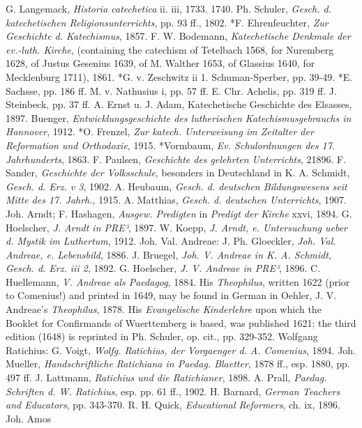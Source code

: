 G. Langemack, \emph{Historia catechetica} ii. iii, 1733. 1740. Ph. Schuler, \emph{Gesch. d. katechetischen Religionsunterrichts}, pp. 93 ff., 1802. *F. Ehrenfeuchter, \emph{Zur Geschichte d. Katechismus}, 1857. F. W. Bodemann, \emph{Katechetische Denkmale der ev.-luth. Kirche}, (containing the catechism of Tetelbach 1568, for Nuremberg 1628, of Justus Gesenius 1639, of M. Walther 1653, of Glassius 1640, for Mecklenburg 1711), 1861. *G. v. Zeschwitz ii 1. Schuman-Sperber, pp. 39-49. *E. Sachsse, pp. 186 ff. M. v. Nathusius i, pp. 57 ff. E. Chr. Achelis, pp. 319 ff. J. Steinbeck, pp. 37 ff. A. Ernst u. J. Adam, Katechetische Geschichte des Elsasses, 1897. Buenger, \emph{Entwicklungsgeschichte des lutherischen Katechismusgebrauchs in Hannover}, 1912. *O. Frenzel, \emph{Zur katech. Unterweisung im Zeitalter der Reformation und Orthodoxie}, 1915. *Vormbaum, \emph{Ev. Schulordnungen des 17. Jahrhunderts}, 1863. F. Paulsen, \emph{Geschichte des gelehrten Unterrichts}, 21896. F. Sander, \emph{Geschichte der Volksschule}, besonders in Deutschland in K. A. Schmidt, \emph{Gesch. d. Erz. v 3}, 1902. A. Heubaum, \emph{Gesch. d. deutschen Bildungswesens seit Mitte des 17. Jahrh.}, 1915. A. Matthias, \emph{Gesch. d. deutschen Unterrichts}, 1907. Joh. Arndt; F. Hashagen, \emph{Ausgew. Predigten} in \emph{Predigt der Kirche} xxvi, 1894. G. Hoelscher, \emph{J. Arndt in PRE³}, 1897. W. Koepp, \emph{J. Arndt, e. Untersuchung ueber d. Mystik im Luthertum}, 1912. Joh. Val. Andreae: J. Ph. Gloeckler, \emph{Joh. Val. Andreae, e. Lebensbild}, 1886. J. Bruegel, \emph{Joh. V. Andreae in K. A. Schmidt, Gesch. d. Erz. iii 2}, 1892. G. Hoelscher, \emph{J. V. Andreae in PRE³}, 1896. C. Huellemann, \emph{V. Andreae als Paedagog}, 1884. His \emph{Theophilus}, written 1622 (prior to Comenius!) and printed in 1649, may be found in German in Oehler, J. V. Andreae's \emph{Theophilus}, 1878. His \emph{Evangelische Kinderlehre} upon which the Booklet for Confirmands of Wuerttemberg is based, was published 1621; the third edition (1648) is reprinted in Ph. Schuler, op. cit., pp. 329-352. Wolfgang Ratichius: G. Voigt, \emph{Wolfg. Ratichius, der Vorgaenger d. A. Comenius}, 1894. Joh. Mueller, \emph{Handschriftliche Ratichiana in Paedag. Blaetter}, 1878 ff., esp. 1880, pp. 497 ff. J. Lattmann, \emph{Ratichius und die Ratichianer}, 1898. A. Prall, \emph{Paedag. Schriften d. W. Ratichius}, esp. pp. 61 ff., 1902. H. Barnard, \emph{German Teachers and Educators}, pp. 343-370. R. H. Quick, \emph{Educational Reformers}, ch. ix, 1896. Joh. Amos
